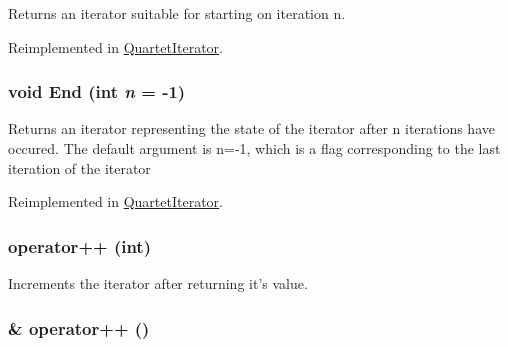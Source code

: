 Returns an iterator suitable for starting on iteration n. 

Reimplemented in \hyperlink{classJKBuilder_1_1QuartetIterator_a34ca36a99b20ae3170babadaffe51ed2}{QuartetIterator}.\hypertarget{classJKBuilder_1_1Iterator_a5f692b73d2e160450f4617bb75825e11}{
\subsubsection[{End}]{\setlength{\rightskip}{0pt plus 5cm}void End (int {\em n} = {\ttfamily -\/1})}}
\label{classJKBuilder_1_1Iterator_a5f692b73d2e160450f4617bb75825e11}


Returns an iterator representing the state of the iterator after n iterations have occured. The default argument is n=-\/1, which is a flag corresponding to the last iteration of the iterator 

Reimplemented in \hyperlink{classJKBuilder_1_1QuartetIterator_a5f692b73d2e160450f4617bb75825e11}{QuartetIterator}.\hypertarget{classJKBuilder_1_1Iterator_ac1702aedba13b4112b891b58dfd78eba}{
\subsubsection[{operator++}]{ operator++ (int)}}
\label{classJKBuilder_1_1Iterator_ac1702aedba13b4112b891b58dfd78eba}


Increments the iterator after returning it's value. \hypertarget{classJKBuilder_1_1Iterator_ae1f21c74128a5ef5d1b9de72ceb09be8}{
\subsubsection[{operator++}]{ \& operator++ ()}}
\label{classJKBuilder_1_1Iterator_ae1f21c74128a5ef5d1b9de72ceb09be8}



